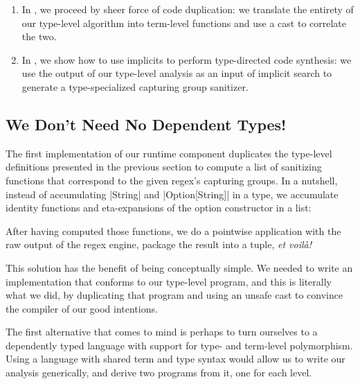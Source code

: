 \begin{enumerate}
  \item In , we proceed by sheer force of code duplication: we translate the entirety of our type-level algorithm into term-level functions and use a cast to correlate the two.

  \item In , we show how to use implicits to perform type-directed code synthesis: we use the output of our type-level analysis as an input of implicit search to generate a type-specialized capturing group sanitizer.
\end{enumerate}

\subsection{We Don't Need No Dependent Types!}
\label{subsec:we-ain-t-need-no-dependent-types}

The first implementation of our runtime component duplicates the type-level definitions presented in the previous section to compute a list of sanitizing functions that correspond to the given regex's capturing groups.
In a nutshell, instead of accumulating |String| and |Option[String]| in a type, we accumulate identity functions and eta-expansions of the option constructor in a list:

\regexTermLvlLoop

\noindent
After having computed those functions, we do a pointwise application with the raw output of the regex engine, package the result into a tuple, \emph{et voilà!}

\regexTransform

This solution has the benefit of being conceptually simple.
We needed to write an implementation that conforms to our type-level program, and this is literally what we did, by duplicating that program and using an unsafe cast to convince the compiler of our good intentions.

The first alternative that comes to mind is perhaps to turn ourselves to a dependently typed language with support for type- and term-level polymorphism.
Using a language with shared term and type syntax would allow us to write our analysis generically, and derive two programs from it, one for each level.

